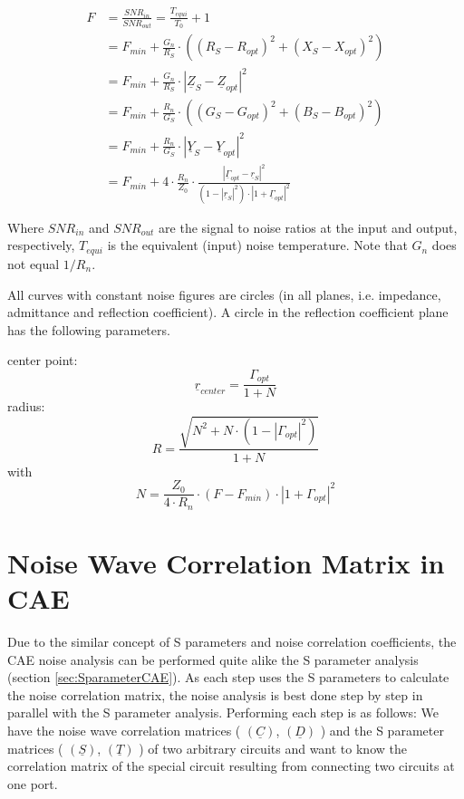 \begin{align}
  F & = \frac{SNR_{in}}{SNR_{out}} = \frac{T_{equi}}{T_0} + 1\\
    & = F_{min} + \frac{G_n}{R_S}\cdot\left( (R_S-R_{opt})^2 + (X_S-X_{opt})^2 \right)\\
    & = F_{min} + \frac{G_n}{R_S}\cdot\left| \underline{Z}_S - \underline{Z}_{opt} \right| ^2\\
    & = F_{min} + \frac{R_n}{G_S}\cdot\left( (G_S-G_{opt})^2 + (B_S-B_{opt})^2 \right)\\
    & = F_{min} + \frac{R_n}{G_S}\cdot\left| \underline{Y}_S - \underline{Y}_{opt} \right| ^2\\
    & = F_{min} + 4\cdot\frac{R_n}{Z_0}\cdot\frac{\left| \underline{\Gamma}_{opt}-\underline{r}_S\right| ^2}
                  {\left( 1-|\underline{r}_S|^2\right)\cdot\left| 1+\underline{\Gamma}_{opt}\right| ^2}
\end{align}

Where $SNR_{in}$ and $SNR_{out}$ are the signal to noise ratios at the
input and output, respectively, $T_{equi}$ is the equivalent (input)
noise temperature.  Note that $G_n$ does not equal $1/R_n$.

\addvspace{12pt}

All curves with constant noise figures are circles (in all planes,
i.e. impedance, admittance and reflection coefficient).  A circle in
the reflection coefficient plane has the following parameters.

\addvspace{12pt}

center point:
\begin{equation}
\underline{r}_{center} = \frac{\Gamma_{opt}}{1+N}
\end{equation}
radius:
\begin{equation}
R = \frac{\sqrt{N^2 + N\cdot(1-|\Gamma_{opt}|^2)}}{1+N}
\end{equation}
with
\begin{equation}
N = \frac{Z_0}{4\cdot R_n}\cdot (F-F_{min})\cdot |1+\Gamma_{opt}|^2
\end{equation}


\section{Noise Wave Correlation Matrix in CAE}

Due to the similar concept of S parameters and noise correlation
coefficients, the CAE noise analysis can be performed quite alike the
S parameter analysis (section \ref{sec:SparameterCAE}). As each step
uses the S parameters to calculate the noise correlation matrix, the
noise analysis is best done step by step in parallel with the S
parameter analysis.  Performing each step is as follows: We have the
noise wave correlation matrices ( $(\underline{C})$, $(\underline{D})$
) and the S parameter matrices ( $(\underline{S})$, $(\underline{T})$
) of two arbitrary circuits and want to know the correlation matrix of
the special circuit resulting from connecting two circuits at one
port.

